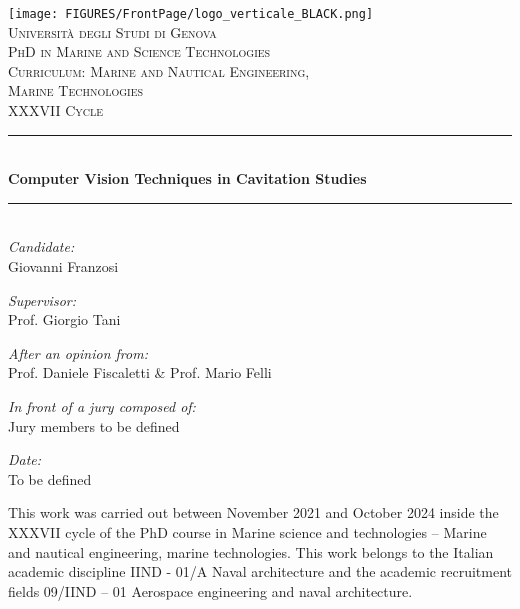 \documentclass[10pt,b5paper,twoside]{book}
\begin{document}
\frontmatter
\begin{titlepage}
    \vspace{1cm}
    \begin{center}
        \texttt{[image: FIGURES/FrontPage/logo\_verticale\_BLACK.png]}\\[1cm]
        \textsc{\LARGE Università degli Studi di Genova}\\[1.5cm]
        
        \textsc{\Large PhD in Marine and Science Technologies} \\[0.5cm]
        \textsc{\large Curriculum: Marine and Nautical Engineering,} \\[0.25cm]
        \textsc{\large Marine Technologies} \\[0.5cm]
        \textsc{\Large XXXVII Cycle}
        \vspace{0.5cm}

        \rule{\linewidth}{0.5mm} \\[0.4cm]
        { \Large \bfseries Computer Vision Techniques in Cavitation Studies}\\[0.2cm]
        \rule{\linewidth}{0.5mm} \\[1cm]

        \large
        \emph{Candidate:}\\
        Giovanni Franzosi
        \vfill

        \large
        \emph{Supervisor:}\\
        Prof. Giorgio Tani
        \vfill

        \large
        \emph{After an opinion from:}\\
        Prof. Daniele Fiscaletti \& Prof. Mario Felli
        \vfill

        \large
        \emph{In front of a jury composed of:}\\
        Jury members to be defined
        \vfill

        \large
        \emph{Date:}\\
        To be defined
        \vfill
    \end{center}
\end{titlepage}

\newpage
\clearpage
\null
\thispagestyle{empty}
\clearpage

\newpage
\clearpage
\null
\thispagestyle{empty}
\begin{centering}
\vspace*{\fill}
This work was carried out between November 2021 and October 2024 inside the XXXVII cycle of the PhD course in Marine science and technologies – Marine and nautical engineering, marine technologies. 
This work belongs to the Italian academic discipline IIND - 01/A Naval architecture and the academic recruitment fields 09/IIND – 01 Aerospace engineering and naval architecture. 
\vspace*{\fill}
\end{centering}
\clearpage
\end{document}
